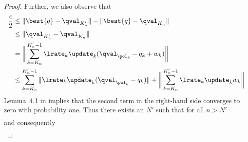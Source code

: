 \begin{proof}
Further, we also observe that
\begin{align*}
    \dfrac{\epsilon}{2}
    &\leq \| \best{q} - \qval_{K'_n} \| - \| \best{q} - \qval_{K_n} \|
    \\
    &\leq \| \qval_{K'_n} - \qval_{K_n} \|
    \\
    &= \bigg\| \sum_{k = K_n}^{K'_n -1} \lrate_k \update_k (\qval_{\pol_k} - q_k + w_k ) \bigg\|
    \\
    &\leq \sum_{k = K_n}^{K'_n -1} \| \lrate_k \update_k ( \qval_{\pol_k} - q_k ) \| + \bigg\| \sum_{k = K_n}^{K'_n -1} \lrate_k \update_k w_k \bigg\| 
\end{align*}
Lemma~4.1 in \cite{Bertsekas1996Neuro-DynamicProgramming} implies that the second term in the right-hand side converges to zero with probability one.
Thus there exists an $N'$ such that for all $n > N'$
\begin{align*}
    
\end{align*}
and consequently
\begin{align*}
    
\end{align*}


\end{proof}
